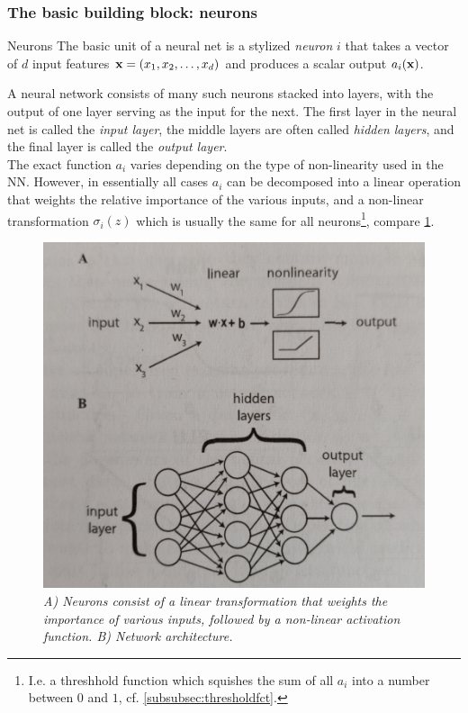 \subsubsection{The basic building block: neurons}
\label{subsubsec:dnnNeurons}
\begin{mybox}{Neurons}
The basic unit of a neural net is a stylized \emph{neuron} $i$ that takes a vector of $d$ input features $\mathbf{x}=(x_1,x_2,\dots,x_d)$ and produces a scalar output $a_i(\mathbf{x})$. 
\end{mybox}
A neural network consists of many such neurons stacked into layers, with the output of one layer serving as the input for the next. The first layer in the neural net is called the \emph{input layer}, the middle layers are often called \emph{hidden layers}, and the final layer is called the \emph{output layer}.\\
The exact function $a_i$ varies depending on the type of non-linearity used in the NN. However, in essentially all cases $a_i$ can be decomposed into a linear operation that weights the relative importance of the various inputs, and a non-linear transformation $\sigma_i(z)$ which is usually the same for all neurons\footnote{I.e. a threshhold function which squishes the sum of all $a_i$ into a number between $0$ and $1$, cf. \ref{subsubsec:thresholdfct}.}, compare \ref{fig:neuron}. 

\begin{figure}[h!]
	\centering
	\includegraphics[width=0.7\linewidth]{gfx/Neuron}
	\caption{\itshape A) Neurons consist of a linear transformation that weights the importance of various inputs, followed by a non-linear activation function. B) Network architecture.}
	\label{fig:neuron}
\end{figure}




